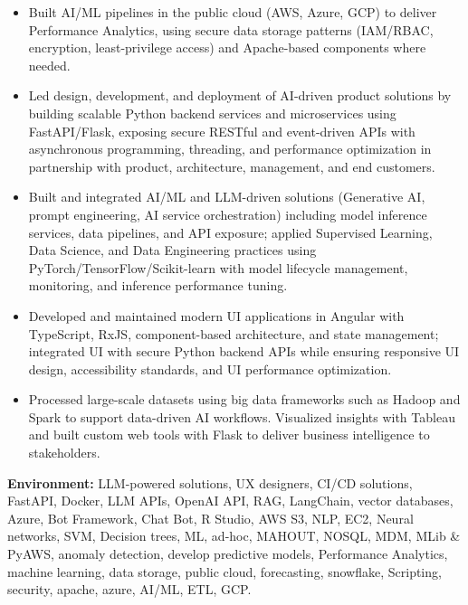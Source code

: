 \documentclass[11pt,letterpaper]{article}
\begin{document}
\begin{itemize}
  \item Built AI/ML pipelines in the public cloud (AWS, Azure, GCP) to deliver Performance
        Analytics, using secure data storage patterns (IAM/RBAC, encryption, least-privilege
        access) and Apache-based components where needed.

  \item Led design, development, and deployment of AI-driven product solutions by building scalable
        Python backend services and microservices using FastAPI/Flask, exposing secure RESTful and
        event-driven APIs with asynchronous programming, threading, and performance optimization in
        partnership with product, architecture, management, and end customers.

  \item Built and integrated AI/ML and LLM-driven solutions (Generative AI, prompt engineering,
        AI service orchestration) including model inference services, data pipelines, and API
        exposure; applied Supervised Learning, Data Science, and Data Engineering practices using
        PyTorch/TensorFlow/Scikit-learn with model lifecycle management, monitoring, and inference
        performance tuning.

  \item Developed and maintained modern UI applications in Angular with TypeScript, RxJS,
        component-based architecture, and state management; integrated UI with secure Python backend
        APIs while ensuring responsive UI design, accessibility standards, and UI performance
        optimization.

  \item Processed large-scale datasets using big data frameworks such as Hadoop and Spark to support
        data-driven AI workflows. Visualized insights with Tableau and built custom web tools with
        Flask to deliver business intelligence to stakeholders.
\end{itemize}

\textbf{Environment:} LLM-powered solutions, UX designers, CI/CD solutions, FastAPI, Docker, LLM APIs,
OpenAI API, RAG, LangChain, vector databases, Azure, Bot Framework, Chat Bot, R Studio, AWS S3, NLP,
EC2, Neural networks, SVM, Decision trees, ML, ad-hoc, MAHOUT, NOSQL, MDM, MLib \& PyAWS, anomaly
detection, develop predictive models, Performance Analytics, machine learning, data storage, public
cloud, forecasting, snowflake, Scripting, security, apache, azure, AI/ML, ETL, GCP.

\vspace{6pt}
\end{document}
